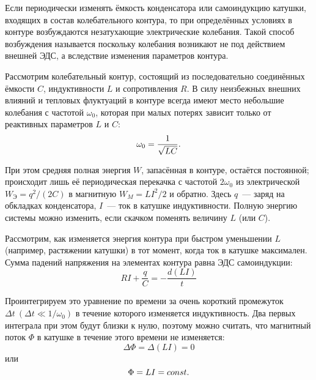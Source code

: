 


Если периодически изменять ёмкость конденсатора или самоиндукцию катушки, входящих в состав колебательного контура, то при определённых условиях в контуре возбуждаются незатухающие электрические колебания. Такой способ возбуждения называется  поскольку колебания возникают не под действием внешней ЭДС, а вследствие изменения параметров контура.

Рассмотрим колебательный контур, состоящий из последовательно соединённых ёмкости $C$, индуктивности $L$ и сопротивления $R$. В силу неизбежных внешних влияний и тепловых флуктуаций в контуре всегда имеют место небольшие колебания с частотой $\omega_0$, которая при малых потерях зависит только от реактивных параметров $L$ и $C$:
\begin{equation}
	\eqmark{4.6.1}
	 \omega_0 = \frac{1}{\sqrt{LC}}.
\end{equation}

При этом средняя полная энергия $W$, запасённая в контуре, остаётся постоянной; происходит лишь её периодическая перекачка с частотой $2\omega_0$ из электрической $W_\text{Э} = q^2 / (2C)$ в магнитную $W_M = LI^2/2$ и обратно. Здесь $q$~--- заряд на обкладках конденсатора, $I$~--- ток в катушке индуктивности. Полную энергию системы можно изменить, если скачком поменять величину $L$ (или $C$).

 Рассмотрим, как изменяется энергия контура при быстром уменьшении $L$ (например, растяжении катушки) в тот момент, когда ток в катушке максимален. Сумма падений напряжения на элементах контура равна ЭДС самоиндукции:
\begin{equation*}
	RI + \frac{q}{C}= - \frac{d(LI)}{t}
\end{equation*}

Проинтегрируем это уравнение по времени за очень короткий промежуток $\Delta t ~(\Delta t \ll 1/\omega_0)$ в течение которого изменяется индуктивность. Два первых интеграла при этом будут близки к нулю, поэтому можно считать, что магнитный поток $\Phi$ в катушке в течение этого времени не изменяется:
\begin{equation*}
	\Delta \Phi=\Delta (LI) = 0
\end{equation*}
 или
\begin{equation}
	\eqmark{4.6.2}
	\Phi=LI =const.
\end{equation}

